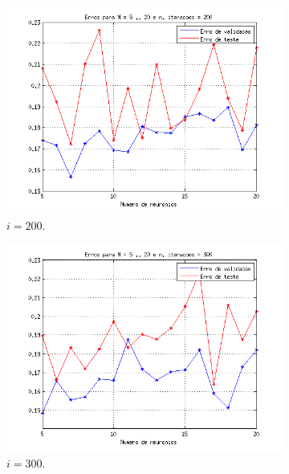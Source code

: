 \begin{figure}[H]
				\begin{subfigure}{.33\textwidth}
				  \centering
				  \includegraphics[width=1\linewidth]{image/mlp_200_iterations}
				  \caption{\(i=200\).}
				\end{subfigure}%
				\begin{subfigure}{.33\textwidth}
				  \centering
				  \includegraphics[width=1\linewidth]{image/mlp_300_iterations}
				  \caption{\(i=300\).}
			\end{subfigure}
			\begin{subfigure}{.33\textwidth}
				  \centering

\end{subfigure}
\end{figure}

